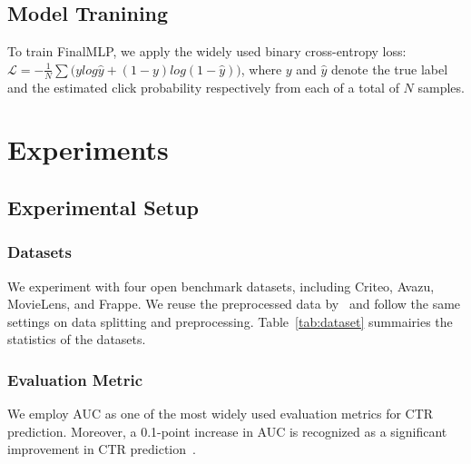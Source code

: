 \documentclass[letterpaper]{article} \usepackage{aaai23}  \usepackage{times}  \usepackage{helvet}  \usepackage{courier}  \usepackage[hyphens]{url}  \usepackage{graphicx} \urlstyle{rm} \def\UrlFont{\rm}  \usepackage{natbib}  \usepackage{caption} \frenchspacing  \setlength{\pdfpagewidth}{8.5in}  \setlength{\pdfpageheight}{11in}  \usepackage{algorithm}
\begin{document}
\subsection{Model Tranining}
To train FinalMLP, we apply the widely used binary cross-entropy loss:
$\mathcal{L} = - \frac{1}{N} \sum\big (y {log}\hat{y} + (1-y) {log}(1 - \hat{y})\big )$,
where $y$ and $\hat{y}$ denote the true label and the estimated click probability respectively from each of a total of $N$ samples.  \section{Experiments}\label{sec:exp}

\subsection{Experimental Setup}

\subsubsection{Datasets}
We experiment with four open benchmark datasets, including Criteo, Avazu, MovieLens, and Frappe. We reuse the preprocessed data by~\cite{AFN} and follow the same settings on data splitting and preprocessing. Table~\ref{tab:dataset} summairies the statistics of the datasets. 






\begin{table}[!t]
\centering
\caption{The statistics of open datasets.}
\label{tab:dataset}
\end{table}



\subsubsection{Evaluation Metric} We employ AUC as one of the most widely used evaluation metrics for CTR prediction. Moreover, a 0.1-point increase in AUC is recognized as a significant improvement in CTR prediction~\cite{WideDeep, AFN, DCN_V2}.
\end{document}
